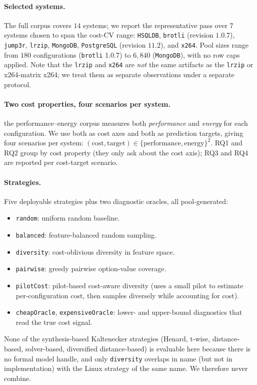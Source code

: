 \paragraph*{Selected systems.}
The full \StudyEnergy corpus covers $14$ systems; we report the
representative pass over $7$ systems chosen to span the cost-CV
range: \texttt{HSQLDB}, \texttt{brotli} (revision $1.0.7$),
\texttt{jump3r}, \texttt{lrzip}, \texttt{MongoDB}, \texttt{PostgreSQL}
(revision $11.2$), and \texttt{x264}. Pool sizes range from $180$
configurations (\texttt{brotli} 1.0.7) to $6{,}840$
(\texttt{MongoDB}), with no row caps applied. Note that the \StudyEnergy
\texttt{lrzip} and \texttt{x264} are \emph{not} the same artifacts as
the \StudyReplication \texttt{lrzip} or x264-matrix x264; we treat them as
separate observations under a separate protocol.

\paragraph*{Two cost properties, four scenarios per system.}
the performance--energy corpus measures both \emph{performance} and
\emph{energy} for each configuration. We use both as cost axes and
both as prediction targets, giving four scenarios per system:
$(\text{cost},\text{target})\in
\{\text{performance},\text{energy}\}^{2}$. RQ1 and RQ2 group by cost
property (they only ask about the cost axis); RQ3 and RQ4 are
reported per cost-target scenario.

\paragraph*{Strategies.}
Five deployable strategies plus two diagnostic oracles, all
pool-generated:
\begin{itemize}
    \item \texttt{random}: uniform random baseline.
    \item \texttt{balanced}: feature-balanced random sampling.
    \item \texttt{diversity}: cost-oblivious diversity in feature
    space.
    \item \texttt{pairwise}: greedy pairwise option-value coverage.
    \item \texttt{pilotCost}: pilot-based cost-aware diversity (uses
    a small pilot to estimate per-configuration cost, then samples
    diversely while accounting for cost).
    \item \texttt{cheapOracle}, \texttt{expensiveOracle}: lower- and
    upper-bound diagnostics that read the true cost signal.
\end{itemize}
None of the synthesis-based Kaltenecker strategies (Henard, t-wise,
distance-based, solver-based, diversified distance-based) is
evaluable here because there is no formal model handle, and only
\texttt{diversity} overlaps in name (but not in implementation) with
the Linux strategy of the same name. We therefore never combine.

